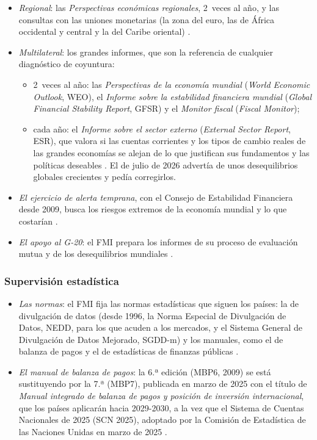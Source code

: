 \documentclass[11pt]{article}
\begin{document}
\begin{itemize}
\item \emph{Regional}: las \emph{Perspectivas económicas regionales}, 2~veces al año, y las consultas con las uniones monetarias (la zona del euro, las de África occidental y central y la del Caribe oriental) .
\item \emph{Multilateral}: los grandes informes, que son la referencia de cualquier diagnóstico de coyuntura:
  \begin{itemize}
  \item 2~veces al año: las \emph{Perspectivas de la economía mundial} (\emph{World Economic Outlook}, WEO), el \emph{Informe sobre la estabilidad financiera mundial} (\emph{Global Financial Stability Report}, GFSR) y el \emph{Monitor fiscal} (\emph{Fiscal Monitor});
  \item cada año: el \emph{Informe sobre el sector externo} (\emph{External Sector Report}, ESR), que valora si las cuentas corrientes y los tipos de cambio reales de las grandes economías se alejan de lo que justifican sus fundamentos y las políticas deseables . El de julio de 2026 advertía de unos desequilibrios globales crecientes y pedía corregirlos\nocite{FMI2026ESR}.
  \end{itemize}
\item \emph{El ejercicio de alerta temprana}, con el Consejo de Estabilidad Financiera desde 2009, busca los riesgos extremos de la economía mundial y lo que costarían .
\item \emph{El apoyo al G-20}: el FMI prepara los informes de su proceso de evaluación mutua y de los desequilibrios mundiales .
\end{itemize}

\subsubsection{Supervisión estadística}\label{sec:estadistica}

\begin{itemize}
\item \emph{Las normas}: el FMI fija las normas estadísticas que siguen los países: la de divulgación de datos (desde 1996, la Norma Especial de Divulgación de Datos, NEDD, para los que acuden a los mercados, y el Sistema General de Divulgación de Datos Mejorado, SGDD-m) y los manuales, como el de balanza de pagos y el de estadísticas de finanzas públicas .
\item \emph{El manual de balanza de pagos}: la 6.ª edición (MBP6, 2009) se está sustituyendo por la 7.ª (MBP7), publicada en marzo de 2025 con el título de \emph{Manual integrado de balanza de pagos y posición de inversión internacional}, que los países aplicarán hacia 2029-2030, a la vez que el Sistema de Cuentas Nacionales de 2025 (SCN 2025), adoptado por la Comisión de Estadística de las Naciones Unidas en marzo de 2025\nocite{FMI2025MBP7} .
\end{itemize}
\end{document}
